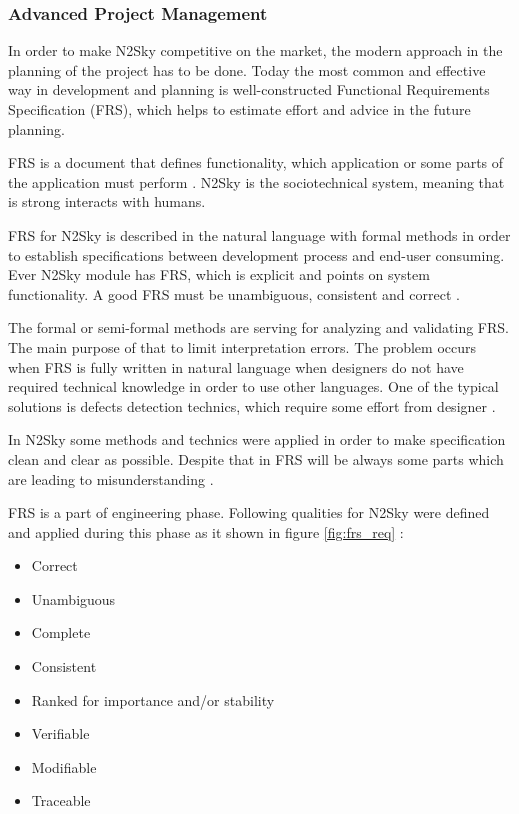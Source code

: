 \subsubsection{Advanced Project Management}\label{Advanced project management}

In order to make N2Sky competitive on the market, the modern approach in the planning of the project has to be done. Today the most common and effective way in development and planning is well-constructed Functional Requirements Specification (FRS), which helps to estimate effort and advice in the future planning. 

FRS is a document that defines functionality, which application or some parts of the application must perform \cite{wiki:frs}. N2Sky is the sociotechnical system, meaning that is strong interacts with humans. 

FRS for N2Sky is described in the natural language with formal methods in order to establish specifications between development process and end-user consuming. Ever N2Sky module has FRS, which is explicit and points on system functionality. A good FRS must be unambiguous, consistent and correct \cite{frs_1}.  
 
 The formal or semi-formal methods are serving for analyzing and validating FRS. The main purpose of that to limit interpretation errors. The problem occurs when FRS is fully written in natural language when designers do not have required technical knowledge in order to use other languages. One of the typical solutions is defects detection technics, which require some effort from designer \cite{frs_3}. 
 
In N2Sky some methods and technics were applied in order to make specification clean and clear as possible. Despite that in FRS will be always some parts which are leading to misunderstanding \cite{frs_1}.
  
FRS is a part of engineering phase. Following qualities for N2Sky were defined and applied during this phase \cite{frs_4} as it shown in figure \ref{fig:frs_req} :
\begin{itemize}
\item Correct
\item Unambiguous
\item Complete
\item Consistent
\item Ranked for importance and/or stability
\item Verifiable
\item Modifiable
\item Traceable 
\end{itemize}



